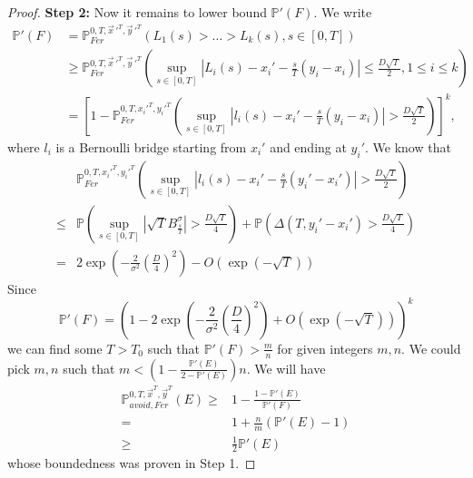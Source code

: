 \begin{proof}
	\noindent\textbf{Step 2:} 
	Now it remains to lower bound $\mathbb{P'}(F)$. We write
	\begin{align*}
	\mathbb{P'}(F) &= \mathbb{P}_{Fer}^{0,T, \vec{x}\,'^T, \vec{y}\,'^T} \left( L_1(s)>\dots>L_k(s), s\in[0,T]\right) \\
	&\geq  \mathbb{P}_{Fer}^{0,T, \vec{x}\,'^T, \vec{y}\,'^T} \left( \sup_{s\in[0,T]}
	| L_i(s)-x_i'-\frac{s}{T}(y_i-x_i) | \leq \frac{D\sqrt{T}}{2}, 1\leq i \leq k \right) \\
	&=  \left[ 1 - \mathbb{P}_{Fer}^{0,T, x_i'^T, y_i'^T} \left( \sup_{s\in[0,T]}
	| l_i(s)-x_i'-\frac{s}{T}(y_i-x_i) | > \frac{D\sqrt{T}}{2} \right) \right]^k ,
	\end{align*}
	where $l_i$ is a Bernoulli bridge starting from $x_i'$ and ending at $y_i'$. We know that
	\begin{align*}
	&\mathbb{P}_{Fer}^{0,T, x_i'^T, y_i'^T} \left( \sup_{s\in[0,T]}
	| l_i(s)-x_i'-\frac{s}{T}(y_i'-x_i') | > \frac{D\sqrt{T}}{2} \right) \\
	\leq& \mathbb{P}\left( \sup_{s\in[0,T]} |\sqrt{T} B^\sigma _\frac{s}{T}| > \frac{D\sqrt{T}}{4} \right)
	+ \mathbb{P} \left( \Delta(T, y_i'-x_i')>\frac{D\sqrt{T}}{4} \right) \\
	=& 2\exp\left(-\frac{2}{\sigma^2}(\frac{D}{4})^2\right) - O(\exp(-\sqrt{T})) 
	\end{align*}
	Since
	$$\mathbb{P'}(F) = \left( 1 - 2\exp\left(-\frac{2}{\sigma^2}(\frac{D}{4})^2\right) + O(\exp(-\sqrt{T}))  \right)^k$$
	we can find some $T>T_0$ such that $\mathbb{P'}(F)  > \frac{m}{n} $ for given integers $m,n$. We could pick $m,n$ such that $m< (1-\frac{\mathbb{P'}(E)}{2-\mathbb{P'}(E)})n$. We will have
	\begin{align*}
	\mathbb{P}_{avoid, Fer}^{0,T, \vec{x}^T, \vec{y}^T}(E) 
	\geq&  1 -  \frac{1-\mathbb{P'}(E)}{\mathbb{P'}(F)} \\
	=& 1+\frac{n}{m} (\mathbb{P'}(E)-1) \\
	\geq & \frac{1}{2}\mathbb{P'}(E)
	\end{align*}
	whose boundedness was proven in Step 1.
\end{proof}

